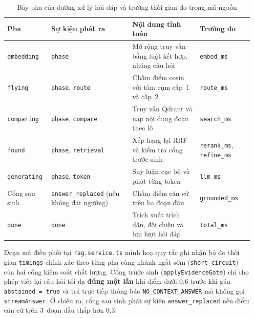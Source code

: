 \begin{table}[htbp]
\centering
\caption{Bảy pha của đường xử lý hỏi đáp và trường thời gian đo trong mã nguồn}
\label{tab:bay-pha-hoi-dap-ch5}
\small
\begin{tabularx}{\textwidth}{
  >{\raggedright\arraybackslash}p{2.3cm}
  >{\raggedright\arraybackslash}p{3.4cm}
  >{\raggedright\arraybackslash}X
  >{\raggedright\arraybackslash}p{3.1cm}
}
\toprule
\textbf{Pha} & \textbf{Sự kiện phát ra} & \textbf{Nội dung tính toán} & \textbf{Trường đo} \\
\midrule
\texttt{embedding} & \texttt{phase} & Mở rộng truy vấn bằng luật kết hợp, nhúng câu hỏi & \texttt{embed\_ms} \\
\midrule
\texttt{flying} & \texttt{phase}, \texttt{route} & Chấm điểm cosin với tâm cụm cấp~1 và cấp~2 & \texttt{route\_ms} \\
\midrule
\texttt{comparing} & \texttt{phase}, \texttt{compare} & Truy vấn Qdrant và nạp nội dung đoạn theo lô & \texttt{search\_ms} \\
\midrule
\texttt{found} & \texttt{phase}, \texttt{retrieval} & Xếp hạng lại RRF và kiểm tra cổng trước sinh & \texttt{rerank\_ms}, \texttt{refine\_ms} \\
\midrule
\texttt{generating} & \texttt{phase}, \texttt{token} & Suy luận cục bộ và phát từng token & \texttt{llm\_ms} \\
\midrule
Cổng sau sinh & \texttt{answer\_\allowbreak{}replaced} (nếu không đạt ngưỡng) & Chấm điểm căn cứ trên ba đoạn đầu & \texttt{grounded\_ms} \\
\midrule
\texttt{done} & \texttt{done} & Trích xuất trích dẫn, đối chiếu và lưu lượt hỏi đáp & \texttt{total\_ms} \\
\bottomrule
\end{tabularx}
\end{table}

Đoạn mã điều phối tại \texttt{rag.\allowbreak{}service.\allowbreak{}ts} minh hoạ quy tắc ghi nhận bộ đo thời gian \texttt{timings} chính xác theo từng pha cùng nhánh ngắt sớm (\texttt{short-circuit}) của hai cổng kiểm soát chất lượng. Cổng trước sinh (\texttt{applyEvidenceGate}) chỉ cho phép viết lại câu hỏi tối đa \textbf{đúng một lần} khi điểm dưới 0,6 trước khi gán \texttt{abstained = true} và trả trực tiếp thông báo \texttt{NO\_\allowbreak{}CONTEXT\_\allowbreak{}ANSWER} mà không gọi \texttt{streamAnswer}. Ở chiều ra, cổng sau sinh phát sự kiện \texttt{answer\_\allowbreak{}replaced} nếu điểm căn cứ trên 3~đoạn đầu thấp hơn 0,3:


